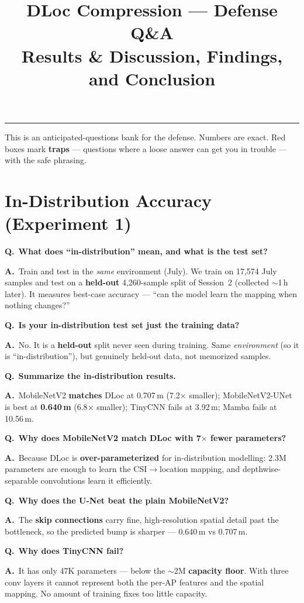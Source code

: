 \documentclass[11pt]{article}
\title{\textbf{DLoc Compression --- Defense Q\&A}\\[2mm]
\large Results \& Discussion, Findings, and Conclusion}
\date{}
\newcommand{\Q}[1]{\medskip\noindent\textbf{\textcolor{blue!50!black}{Q.}}\ \textbf{#1}\par\nopagebreak}
\newcommand{\A}{\noindent\textbf{A.}\ }
\begin{document}
\maketitle
\tableofcontents
\vspace{3mm}\hrule\vspace{3mm}

\noindent This is an anticipated-questions bank for the defense. Numbers are exact. Red boxes mark
\textbf{traps} --- questions where a loose answer can get you in trouble --- with the safe phrasing.

\section{In-Distribution Accuracy (Experiment 1)}

\Q{What does ``in-distribution'' mean, and what is the test set?}
\A Train and test in the \emph{same} environment (July). We train on 17{,}574 July samples and test on a
\textbf{held-out} 4{,}260-sample split of Session~2 (collected $\sim$1\,h later). It measures best-case
accuracy --- ``can the model learn the mapping when nothing changes?''

\Q{Is your in-distribution test set just the training data?}
\A No. It is a \textbf{held-out} split never seen during training. Same \emph{environment} (so it is
``in-distribution''), but genuinely held-out data, not memorized samples.

\Q{Summarize the in-distribution results.}
\A MobileNetV2 \textbf{matches} DLoc at 0.707\,m (7.2$\times$ smaller); MobileNetV2-UNet is best at
\textbf{0.640\,m} (6.8$\times$ smaller); TinyCNN fails at 3.92\,m; Mamba fails at 10.56\,m.

\Q{Why does MobileNetV2 match DLoc with 7$\times$ fewer parameters?}
\A Because DLoc is \textbf{over-parameterized} for in-distribution modelling: 2.3M parameters are enough
to learn the CSI$\to$location mapping, and depthwise-separable convolutions learn it efficiently.

\Q{Why does the U-Net beat the plain MobileNetV2?}
\A The \textbf{skip connections} carry fine, high-resolution spatial detail past the bottleneck, so the
predicted bump is sharper --- 0.640\,m vs 0.707\,m.

\Q{Why does TinyCNN fail?}
\A It has only 47K parameters --- below the $\sim$2M \textbf{capacity floor}. With three conv layers it
cannot represent both the per-AP features and the spatial mapping. No amount of training fixes too little
capacity.
\end{document}

